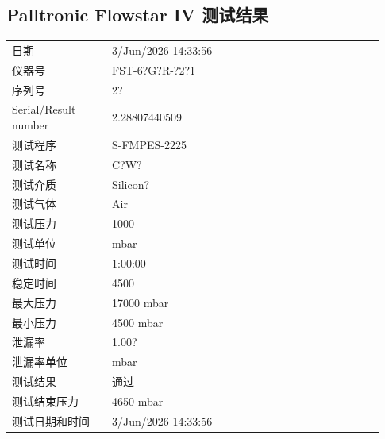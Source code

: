 \documentclass[UTF8,10pt,a4paper,fontset=fandol]{ctexart}
\newcommand{\fieldvalue}[1]{#1}
\begin{document}
\begin{center}
\begin{minipage}{0.92\linewidth}
\section*{Palltronic Flowstar IV 测试结果}

\begin{tabular}{@{}p{0.25\linewidth}p{0.68\linewidth}@{}}
日期 &
\fieldvalue{3/Jun/2026 14:33:56}
\\[2pt]
仪器号 &
\fieldvalue{FST-6?G?R-?2?1}
\\[2pt]
序列号 &
\fieldvalue{2?}
\\[2pt]
Serial/Result number &
\fieldvalue{2.28807440509}
\\[2pt]
测试程序 &
\fieldvalue{S-FMPES-2225}
\\[2pt]
测试名称 &
\fieldvalue{C?W?}
\\[2pt]
测试介质 &
\fieldvalue{Silicon?}
\\[2pt]
测试气体 &
\fieldvalue{Air}
\\[2pt]
测试压力 &
\fieldvalue{1000}
\\[2pt]
测试单位 &
\fieldvalue{mbar}
\\[2pt]
测试时间 &
\fieldvalue{1:00:00}
\\[2pt]
稳定时间 &
\fieldvalue{4500}
\\[2pt]
最大压力 &
\fieldvalue{17000 mbar}
\\[2pt]
最小压力 &
\fieldvalue{4500 mbar}
\\[2pt]
泄漏率 &
\fieldvalue{1.00?}
\\[2pt]
泄漏率单位 &
\fieldvalue{mbar}
\\[2pt]
测试结果 &
\fieldvalue{通过}
\\[2pt]
测试结束压力 &
\fieldvalue{4650 mbar}
\\[2pt]
测试日期和时间 &
\fieldvalue{3/Jun/2026 14:33:56}
\end{tabular}


\end{minipage}
\end{center}
\end{document}
